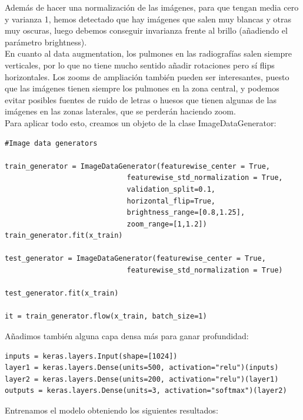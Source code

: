 \documentclass[11pt,a4paper]{article}
\theoremstyle{definition}
\begin{document}
Además de hacer una normalización de las imágenes, para que tengan media cero y varianza 1, hemos detectado que hay imágenes que salen muy blancas y otras muy oscuras, luego debemos conseguir invarianza frente al brillo (añadiendo el parámetro brightness).\\

En cuanto al data augmentation, los pulmones en las radiografías salen siempre verticales, por lo que no tiene mucho sentido añadir rotaciones pero sí flips horizontales. Los zooms de ampliación también pueden ser interesantes, puesto que las imágenes tienen siempre los pulmones en la zona central, y podemos evitar posibles fuentes de ruido de letras o huesos que tienen algunas de las imágenes en las zonas laterales, que se perderán haciendo zoom.\\

Para aplicar todo esto, creamos un objeto de la clase ImageDataGenerator:

\begin{lstlisting}
#Image data generators

train_generator = ImageDataGenerator(featurewise_center = True,
                             featurewise_std_normalization = True,
                             validation_split=0.1,
                             horizontal_flip=True,
                             brightness_range=[0.8,1.25],
                             zoom_range=[1,1.2])
train_generator.fit(x_train)

test_generator = ImageDataGenerator(featurewise_center = True,
                             featurewise_std_normalization = True)

test_generator.fit(x_train)

it = train_generator.flow(x_train, batch_size=1)
\end{lstlisting}

Añadimos también alguna capa densa más para ganar profundidad:

\begin{lstlisting}
inputs = keras.layers.Input(shape=[1024])
layer1 = keras.layers.Dense(units=500, activation="relu")(inputs)
layer2 = keras.layers.Dense(units=200, activation="relu")(layer1)
outputs = keras.layers.Dense(units=3, activation="softmax")(layer2)
\end{lstlisting}

Entrenamos el modelo obteniendo los siguientes resultados:
\end{document}
